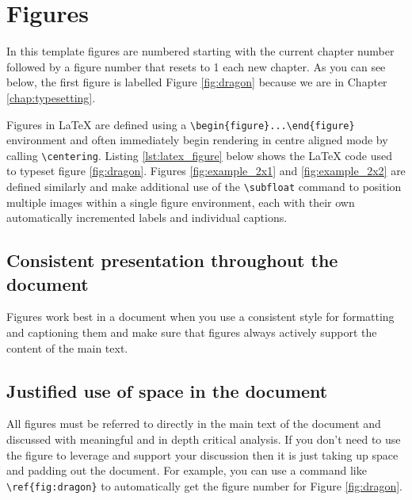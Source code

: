 \section{Figures}
	\label{sec:typesetting_figures}
	
	In this template figures are numbered starting with the current chapter number followed by a figure number that resets to 1 each new chapter. As you can see below, the first figure is labelled Figure \ref{fig:dragon} because we are in Chapter \ref{chap:typesetting}.
	
	Figures in LaTeX are defined using a \lstinline|\begin{figure}...\end{figure}| environment and often immediately begin rendering in centre aligned mode by calling \lstinline|\centering|. Listing \ref{lst:latex_figure} below shows the LaTeX code used to typeset figure \ref{fig:dragon}. Figures \ref{fig:example_2x1} and \ref{fig:example_2x2} are defined similarly and make additional use of the \lstinline|\subfloat| command to position multiple images within a single figure environment, each with their own automatically incremented labels and individual captions.

	

	\subsection{Consistent presentation throughout the document}
		Figures work best in a document when you use a consistent style for formatting and captioning them and make sure that figures always actively support the content of the main text. 
	
	\subsection{Justified use of space in the document}
		All figures must be referred to directly in the main text of the document and discussed with meaningful and in depth critical analysis. If you don't need to use the figure to leverage and support your discussion then it is just taking up space and padding out the document. For example, you can use a command like \lstinline|\ref{fig:dragon}| to automatically get the figure number for Figure \ref{fig:dragon}. 	
		
		
		
